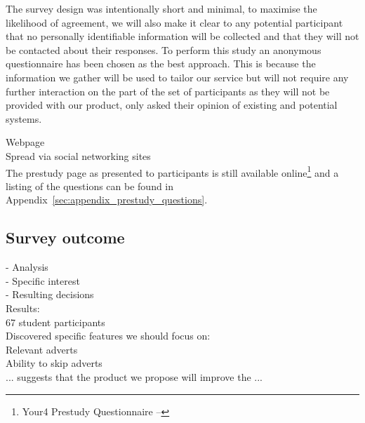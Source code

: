 
The survey design was intentionally short and minimal, to maximise the likelihood of agreement, we will also make it clear to any potential participant that no personally identifiable information will be collected and that they will not be contacted about their responses. %
To perform this study an anonymous questionnaire has been chosen as the best approach.
This is because the information we gather will be used to tailor our service but will not require any further interaction on the part of the set of participants as they will not be provided with our product, only asked their opinion of existing and potential systems.


Webpage\\
Spread via social networking sites\\


The prestudy page as presented to participants is still available online\footnote{Your4 Prestudy Questionnaire -- } and a listing of the questions can be found in Appendix~\ref{sec:appendix_prestudy_questions}. %


\subsection{Survey outcome}



 - Analysis\\
  - Specific interest\\
  - Resulting decisions\\

Results:\\
67 student participants\\
Discovered specific features we should focus on:\\
Relevant adverts\\
Ability to skip adverts\\
... suggests that the product we propose will improve the ...

